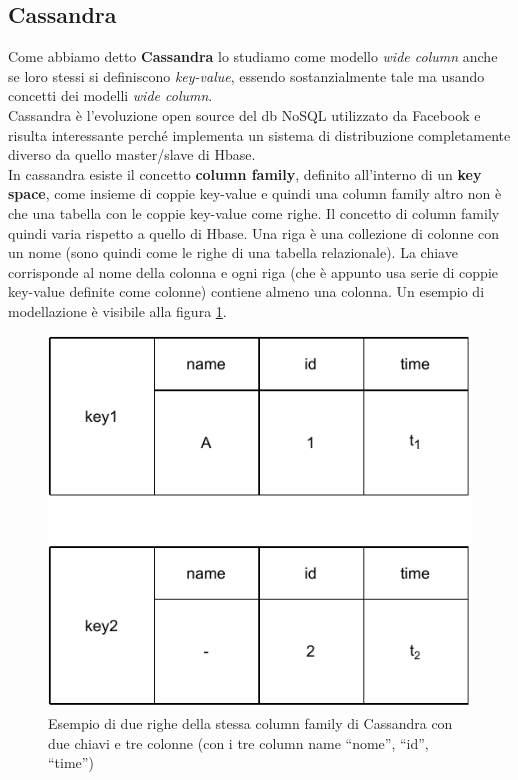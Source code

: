 \documentclass[a4paper,12pt, oneside]{book}
\begin{document}
\subsection{Cassandra}
Come abbiamo detto \textbf{Cassandra} lo studiamo come modello \textit{wide
  column} anche se loro stessi si definiscono \textit{key-value}, essendo
sostanzialmente tale ma usando concetti dei modelli \textit{wide column}.\\
Cassandra è l'evoluzione open source del db NoSQL utilizzato da Facebook e
risulta interessante perché implementa un sistema di distribuzione
completamente diverso da quello master/slave di Hbase.\\
In cassandra esiste il concetto \textbf{column family}, definito all'interno di
un \textbf{key space}, come insieme di coppie
key-value e quindi una column family altro non è che una tabella con le coppie
key-value come righe. Il concetto di column family quindi varia rispetto a
quello di Hbase. Una riga è una collezione di colonne con un nome (sono quindi
come le righe di una tabella relazionale). La chiave corrisponde al nome della
colonna e ogni riga (che è appunto usa serie di coppie key-value definite come
colonne) contiene almeno una colonna. Un esempio di modellazione è visibile alla
figura \ref{fig:cas}.
\begin{figure}
  \centering
  \includegraphics[scale = 0.8]{img/cas.pdf}
  \caption{Esempio di due righe della stessa column family di Cassandra con
    due chiavi e tre colonne (con i tre column name ``nome'', ``id'', ``time'')}
  \label{fig:cas}
\end{figure}
\end{document}
